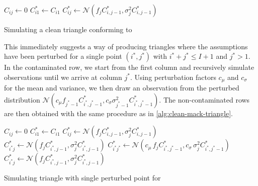 \documentclass[a4paper]{book}
\begin{document}
\begin{algorithm}[!htb]
  \begin{algorithmic}
      \State $C_{ij} \gets 0$
    \EndFor
      \State $C^*_{i1} \gets C_{i1}$
        \State $C^*_{ij} \gets \mathcal{N}(f_j C^*_{i, j - 1}, \sigma_j^2 C^*_{i, j - 1})$
      \EndFor
    \EndFor
    \State {}
  \end{algorithmic}
  \caption{Simulating a clean triangle conforming to }
  \label{alg:clean-mack-triangle}
\end{algorithm}

\restoregeometry

This immediately suggests a way of producing triangles where the assumptions have been perturbed for a single point $(i^*, j^*)$ with $i^* + j^* \leq I + 1$ and $j^* > 1$. In the contaminated row, we start from the first column and recursively simulate observations until we arrive at column $j^*$. Using perturbation factors $c_\mu$ and $c_\sigma$ for the mean and variance, we then draw an observation from the perturbed distribution $\mathcal{N}(c_\mu f_{j^* - 1} C^*_{i^*, j^* - 1}, c_\sigma \sigma^2_{j^* - 1} C^*_{i^*, j^* - 1})$. The non-contaminated rows are then obtained with the same procedure as in \cref{alg:clean-mack-triangle}.

\begin{algorithm}[!htb]
  \begin{algorithmic}
      \State $C_{ij} \gets 0$
    \EndFor
      \State $C^*_{i1} \gets C_{i1}$
          \State $C^*_{ij} \gets \mathcal{N}(f_j C^*_{i, j - 1}, \sigma_j^2 C^*_{i, j - 1})$
        \EndFor
      \Else
          \State $C^*_{i^*j} \gets \mathcal{N}(f_j C^*_{i^*, j - 1}, \sigma_j^2 C^*_{i^*, j - 1})$
        \EndFor
        \State $C^*_{i^*j^*} \gets \mathcal{N}(c_\mu \, f_j C^*_{i^*, j^* - 1}, c_\sigma \, \sigma_j^2 C^*_{i^*, j^* - 1})$
          \State $C^*_{i^*j} \gets \mathcal{N}(f_j C^*_{i^*, j - 1}, \sigma_j^2 C^*_{i^*, j - 1})$
        \EndFor
      \EndIf
    \EndFor
    \State {}
  \end{algorithmic}
  \caption{Simulating triangle with single perturbed point for }
  \label{alg:pert-mack-triangle}
\end{algorithm}
\end{document}
